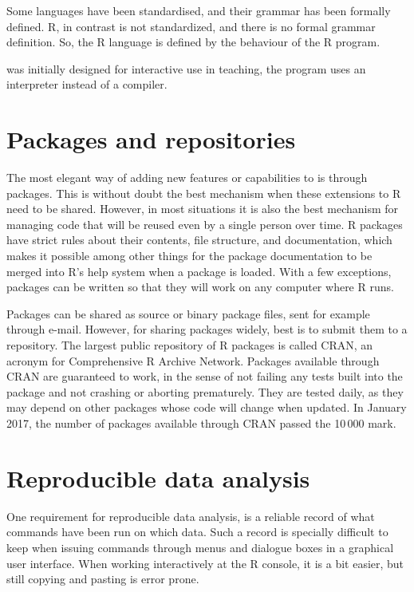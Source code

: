 \documentclass[krantz2,ChapterTOCs]{krantz}\usepackage{knitr}
\begin{document}
\begin{explainbox}
Some languages have been standardised, and their grammar has been formally defined. R, in contrast is not standardized, and there is no formal grammar definition. So, the R language is defined by the behaviour of the R program.
\end{explainbox}

 was initially designed for interactive use in teaching, the  program uses an interpreter instead of a compiler.

\section{Packages and repositories}

The most elegant way of adding new features or capabilities to \Rlang is through packages. This is without doubt the best mechanism when these extensions to R need to be shared. However, in most situations it is also the best mechanism for managing code that will be reused even by a single person over time. R packages have strict rules about their contents, file structure, and documentation, which makes it possible among other things for the package documentation to be merged into R's help system when a package is loaded. With a few exceptions, packages can be written so that they will work on any computer where R runs.

Packages can be shared as source or binary package files, sent for example through e-mail. However, for sharing packages widely, best is to submit them to a repository. The largest public repository of R packages is called CRAN, an acronym for Comprehensive R Archive Network. Packages available through CRAN are guaranteed to work, in the sense of not failing any tests built into the package and not crashing or aborting prematurely. They are tested daily, as they may depend on other packages whose code will change when updated. In January 2017, the number of packages available through CRAN passed the 10\,000 mark.

\section{Reproducible data analysis}

One requirement for reproducible data analysis, is a reliable record of what commands have been run on which data. Such a record is specially difficult to keep when issuing commands through menus and dialogue boxes in a graphical user interface. When working interactively at the R console, it is a bit easier, but still copying and pasting is error prone.
\end{document}
